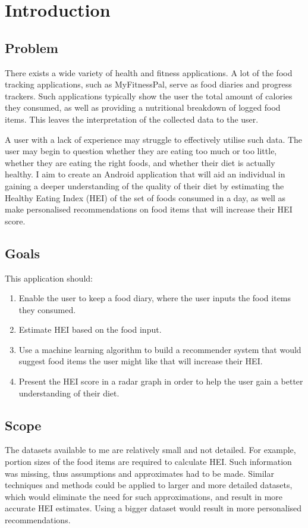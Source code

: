 \documentclass{article}
\begin{document}
\newpage
\section{Introduction}
\subsection{Problem}
There exists a wide variety of health and fitness applications. A lot of the food tracking applications, such as MyFitnessPal, serve as food diaries and progress trackers. Such applications typically show the user the total amount of calories they consumed, as well as providing a nutritional breakdown of logged food items. This leaves the interpretation of the collected data to the user. 

\bigskip
\noindent A user with a lack of experience may struggle to effectively utilise such data. The user may begin to question whether they are eating too much or too little, whether they are eating the right foods, and whether their diet is actually healthy. I aim to create an Android application that will aid an individual in gaining a deeper understanding of the quality of their diet by estimating the Healthy Eating Index (HEI) of the set of foods consumed in a day, as well as make personalised recommendations on food items that will increase their HEI score.

\subsection{Goals}
This application should:
\begin{enumerate}
  \item Enable the user to keep a food diary, where the user inputs the food items they consumed.
  \item Estimate HEI based on the food input.
  \item Use a machine learning algorithm to build a recommender system that would suggest food items the user might like that will increase their HEI.
  \item Present the HEI score in a radar graph in order to help the user gain a better understanding of their diet.
\end{enumerate}

\subsection{Scope}
\noindent The datasets available to me are relatively small and not detailed. For example, portion sizes of the food items are required to calculate HEI. Such information was missing, thus assumptions and approximates had to be made. Similar techniques and methods could be applied to larger and more detailed datasets, which would eliminate the need for such approximations, and result in more accurate HEI estimates. Using a bigger dataset would result in more personalised recommendations.
\end{document}
